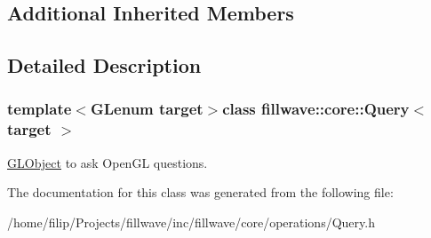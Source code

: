 \subsection*{Additional Inherited Members}


\subsection{Detailed Description}
\subsubsection*{template$<$G\+Lenum target$>$class fillwave\+::core\+::\+Query$<$ target $>$}

\hyperlink{classfillwave_1_1core_1_1GLObject}{G\+L\+Object} to ask Open\+G\+L questions. 

The documentation for this class was generated from the following file\+:\begin{DoxyCompactItemize}
\item 
/home/filip/\+Projects/fillwave/inc/fillwave/core/operations/Query.\+h\end{DoxyCompactItemize}
